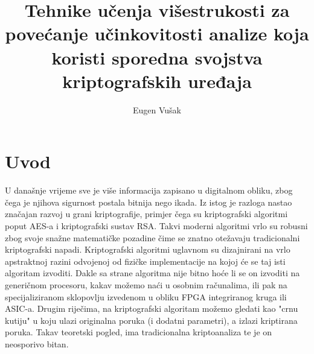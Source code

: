 \documentclass[times, utf8, diplomski]{fer}
\begin{document}

\title{
    Tehnike učenja višestrukosti za povećanje učinkovitosti
    analize koja koristi sporedna svojstva kriptografskih uređaja
}

\author{Eugen Vušak}

\maketitle

\izvornik

\zahvala{}

\tableofcontents


\chapter{Uvod}
U današnje vrijeme sve je više informacija zapisano u digitalnom obliku, zbog čega je njihova sigurnost postala bitnija nego ikada. Iz istog je razloga nastao značajan razvoj u grani kriptografije, primjer čega su kriptografski algoritmi poput AES-a i kriptografski sustav RSA. Takvi moderni algoritmi vrlo su robusni zbog svoje snažne matematičke pozadine čime se znatno otežavaju tradicionalni kriptografski napadi. Kriptografski algoritmi uglavnom su dizajnirani na vrlo apstraktnoj razini odvojenoj od fizičke implementacije na kojoj će se taj isti algoritam izvoditi. Dakle sa strane algoritma nije bitno hoće li se on izvoditi na generičnom procesoru, kakav možemo naći u osobnim računalima, ili pak na specijaliziranom sklopovlju izvedenom u obliku FPGA integriranog kruga ili ASIC-a. Drugim riječima, na kriptografski algoritam možemo gledati kao "crnu kutiju" u koju ulazi originalna poruka (i dodatni parametri), a izlazi kriptirana poruka. Takav teoretski pogled, ima tradicionalna kriptoanaliza te je on neosporivo bitan.
\end{document}
